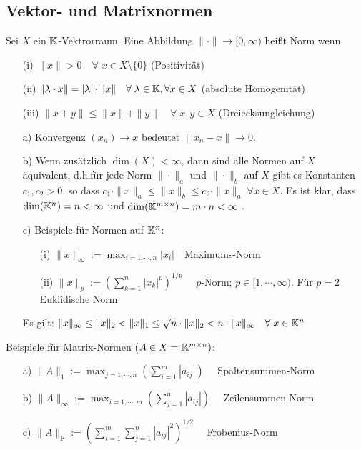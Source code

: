 \subsection{Vektor- und Matrixnormen}
\begin{Definition} [Norm]
  Sei $X$ ein $\mathbb K$-Vektrorraum. Eine Abbildung $\| \cdot \| \rightarrow [0, \infty)$
  heißt Norm wenn
  \begin{enumerate}
    \item[(i)]    $\|x\| > 0 \quad \forall \; x \in X \setminus \lbrace 0 \rbrace$ (Positivität)
    \item[(ii)]   $\| \lambda \cdot x\| = |\lambda| \cdot \|x\| \quad \forall \; \lambda \in \mathbb K, \forall x \in X$ (absolute Homogenität)
    \item[(iii)]  $\|x + y \| \le \|x\| + \|y\| \quad \forall \; x, y \in X$ (Dreiecksungleichung)
  \end{enumerate}
\end{Definition}

\begin{Bemerkungen}
\quad
  \begin{enumerate}
    \item[a)] Konvergenz $(x_n) \rightarrow x$ bedeutet $\|x_n - x\| \rightarrow 0$.
    \item[b)] Wenn zusätzlich $\dim (X) < \infty$, dann sind alle Normen auf $X$
    äquivalent, d.h.für jede Norm $\| \cdot \|_a$ und $\| \cdot \|_b$ auf $X$ gibt
    es Konstanten $c_1, c_2 > 0$, so dass
    $c_1 \cdot \| x \|_a \le \| x \|_b \le c_2 \cdot \| x \|_a \; \forall x \in X$.
    Es ist klar, dass $\dim(\mathbb K^n) = n < \infty$ und
    $\dim(\mathbb K^{m \times n}) = m \cdot n  < \infty$ .
    \item[c)] Beispiele für Normen auf $\mathbb K^n$:
    \begin{enumerate}
      \item[(i)] $\|x\|_\infty := \max_{i = 1, \cdots , n} |x_i| \quad $Maximums-Norm
      \item[(ii)] $\|x\|_p := \left( \sum_{k = 1}^n |x_k|^p \right)^{1/p} \quad$
      $p$-Norm; $p \in [1, \cdots , \infty)$. Für $p = 2$ Euklidische Norm.
    \end{enumerate}
    Es gilt:
    $\|x\|_\infty \le \|x\|_2 < \|x\|_1 \le \sqrt{n} \cdot \|x\|_2 < n \cdot \|x\|_\infty
    \quad \forall \; x \in \mathbb K^n$
  \end{enumerate}
\end{Bemerkungen}

Beispiele für Matrix-Normen ($A \in X = \mathbb K^{m \times n})$:
\begin{enumerate}
  \item[a)] $\|A\|_1 :=  \max_{j = 1, \cdots , n} \left( \sum_{i = 1}^m |a_{ij}| \right) \quad$ Spaltensummen-Norm
  \item[b)] $\|A\|_\infty :=  \max_{i = 1, \cdots , m} \left( \sum_{j = 1}^n |a_{ij}| \right) \quad$ Zeilensummen-Norm
  \item[c)] $\|A\|_{\text{F}} :=  \left(\sum_{i = 1}^m  \sum_{j = 1}^n |a_{ij}|^2 \right)^{1/2} \quad$
  Frobenius-Norm
\end{enumerate}

